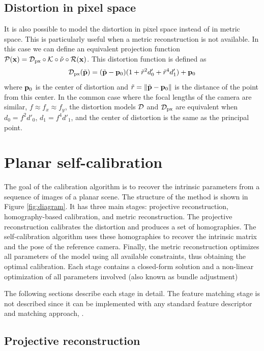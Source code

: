 \documentclass[10pt,twocolumn,letterpaper]{article}
\begin{document}
\subsection{Distortion in pixel space}

It is also possible to model the distortion in pixel space instead of in metric space. This is particularly useful when a metric reconstruction is not available. In this case we can define an equivalent projection function $\mathcal{P}(\mathbf{x}) = \mathcal{D}_{\text{px}} \circ \mathcal{K} \circ \check{\nu} \circ \mathcal{R}(\mathbf{x})$. This distortion function is defined as
%
\begin{align}
\mathcal{D}_{\text{px}}(\tilde{\mathbf{p}}) = (\tilde{\mathbf{p}} - \mathbf{p}_0)(1+\tilde{r}^2 d'_0 + \tilde{r}^4 d'_1) + \mathbf{p}_0
\label{eq:distortion_pixels}
\end{align}
%
where $\mathbf{p}_0$ is the center of distortion and $\tilde{r}=\lVert\tilde{\mathbf{p}}-\mathbf{p}_0\rVert$ is the distance of the point from this center. In the common case where the focal lengths of the camera are similar, \ie $f \approx f_x \approx f_y$, the distortion models $\mathcal{D}$ and $\mathcal{D}_{\text{px}}$ are equivalent when $d_0 = f^2 d'_0$, $d_1=f^4 d'_1$, and the center of distortion is the same as the principal point.

\section{Planar self-calibration}
The goal of the calibration algorithm is to recover the intrinsic parameters from a sequence of images of a planar scene. The structure of the method is shown in Figure \ref{fig:diagram}. It has three main stages: projective reconstruction, homography-based calibration, and metric reconstruction. The projective reconstruction calibrates the distortion and produces a set of homographies. The self-calibration algorithm uses these homographies to recover the intrinsic matrix and the pose of the reference camera. Finally, the metric reconstruction optimizes all parameters of the model using all available constraints, thus obtaining the optimal calibration. Each stage contains a closed-form solution and a non-linear optimization of all parameters involved (also known as bundle adjustment)

The following sections describe each stage in detail. The feature matching stage is not described since it can be implemented with any standard feature descriptor and matching approach, \eg \cite{rublee2011orb}.

\subsection{Projective reconstruction}
\end{document}
